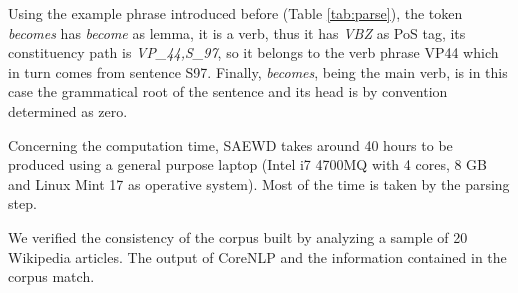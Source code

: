 Using the example phrase introduced before (Table \ref{tab:parse}), the token \textit{becomes} has \textit{become} as lemma, it is a verb, thus it has \textit{VBZ} as PoS tag, its constituency path is \textit{VP\_44,S\_97}, so it belongs to the verb phrase {VP44} which in turn comes from sentence {S97}. Finally, \textit{becomes}, being the main verb, is in this case the grammatical root of the sentence and its head is by convention determined as  zero. 

Concerning the computation time, SAEWD takes around 40 hours to be produced using a general purpose laptop (Intel i7 4700MQ with 4 cores, 8 GB and Linux Mint 17 as operative system). Most of the time is taken by the parsing step. 

We verified the consistency of the corpus built by analyzing a sample of 20 Wikipedia articles. The output of CoreNLP and the information contained in the corpus match.


